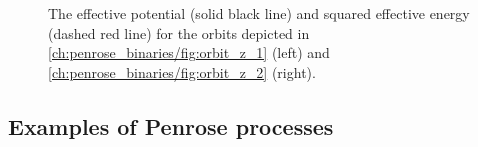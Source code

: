 \begin{figure}[!htbp]
    \centering
    \caption{The effective potential (solid black line) and squared effective energy (dashed red line) for the orbits depicted in \ref{ch:penrose_binaries/fig:orbit_z_1} (left) and \ref{ch:penrose_binaries/fig:orbit_z_2} (right).}
    \label{ch:penrose_binaries/fig:veff_graphs}
\end{figure}

\subsection{Examples of Penrose processes}

